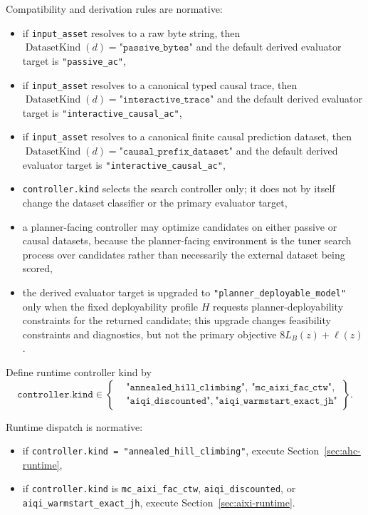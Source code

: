 \documentclass[11pt]{article}
\begin{document}
Compatibility and derivation rules are normative:
\begin{itemize}
    \item if \texttt{input\_asset} resolves to a raw byte string, then
    $\operatorname{DatasetKind}(d)=\texttt{"passive\_bytes"}$ and the default
    derived evaluator target is \texttt{"passive\_ac"},
    \item if \texttt{input\_asset} resolves to a canonical typed causal trace,
    then
    $\operatorname{DatasetKind}(d)=\texttt{"interactive\_trace"}$ and the
    default derived evaluator target is \texttt{"interactive\_causal\_ac"},
    \item if \texttt{input\_asset} resolves to a canonical finite causal
    prediction dataset, then
    $\operatorname{DatasetKind}(d)=\texttt{"causal\_prefix\_dataset"}$ and the
    default derived evaluator target is \texttt{"interactive\_causal\_ac"},
    \item \texttt{controller.kind} selects the search controller only; it does
    not by itself change the dataset classifier or the primary evaluator
    target,
    \item a planner-facing controller may optimize candidates on either passive
    or causal datasets, because the planner-facing environment is the tuner
    search process over candidates rather than necessarily the external dataset
    being scored,
    \item the derived evaluator target is upgraded to
    \texttt{"planner\_deployable\_model"} only when the fixed deployability
    profile $H$ requests planner-deployability constraints for the returned
    candidate; this upgrade changes feasibility constraints and diagnostics,
    but not the primary objective $8L_B(z)+\ell(z)$.
\end{itemize}

Define runtime controller kind by
\[
\texttt{controller.kind}\in
\left\{
\begin{aligned}
&\texttt{"annealed\_hill\_climbing"},\ \texttt{"mc\_aixi\_fac\_ctw"},\\
&\texttt{"aiqi\_discounted"},\ \texttt{"aiqi\_warmstart\_exact\_jh"}
\end{aligned}
\right\}.
\]

Runtime dispatch is normative:
\begin{itemize}
    \item if \texttt{controller.kind = "annealed\_hill\_climbing"}, execute
    Section~\ref{sec:ahc-runtime},
    \item if \texttt{controller.kind} is
    \texttt{mc\_aixi\_fac\_ctw}, \texttt{aiqi\_discounted}, or
    \texttt{aiqi\_warmstart\_exact\allowbreak\_jh}, execute
    Section~\ref{sec:aixi-runtime}.
\end{itemize}
\end{document}
